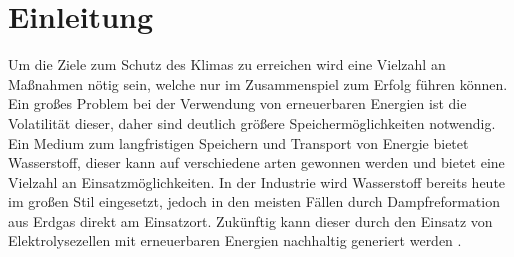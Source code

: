 \chapter{Einleitung}
Um die Ziele zum Schutz des Klimas zu erreichen wird eine Vielzahl an Maßnahmen nötig sein, welche nur im Zusammenspiel zum Erfolg führen können. Ein großes Problem bei der Verwendung von erneuerbaren Energien ist die Volatilität dieser, daher sind deutlich größere Speichermöglichkeiten notwendig. Ein Medium zum langfristigen Speichern und Transport von Energie bietet Wasserstoff, dieser kann auf verschiedene arten gewonnen werden und bietet eine Vielzahl an Einsatzmöglichkeiten. In der Industrie wird Wasserstoff bereits heute im großen Stil eingesetzt, jedoch in den meisten Fällen durch Dampfreformation aus Erdgas direkt am Einsatzort. Zukünftig kann dieser durch den Einsatz von Elektrolysezellen mit erneuerbaren Energien nachhaltig generiert werden \cite{Elektrolyse}. 



